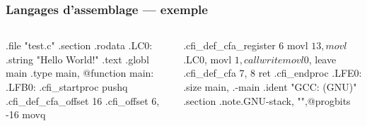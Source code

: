 \documentclass[utf8,10pt]{beamer}
\begin{document}
\begin{frame}[fragile]
    \frametitle{Langages d'assemblage --- exemple}

\begin{columns}[t]
    \begin{column}{0.49\textwidth}
            \begin{block}{}
\begin{pyglist}[language=shell] 
    .file   "test.c"
    .section        .rodata
.LC0:
    .string "Hello World!\n"
    .text
.globl main
    .type   main, @function
main:
.LFB0:
    .cfi_startproc
    pushq   %
    .cfi_def_cfa_offset 16
    .cfi_offset 6, -16
    movq    %
\end{pyglist}       
        \end{block}
    \end{column}
    
    \hfill
    
    \begin{column}{0.49\textwidth}
        \begin{block}{} 
\begin{pyglist}[language=shell] 
    .cfi_def_cfa_register 6
    movl    $13, %
    movl    $.LC0, %
    movl    $1, %
    call    write
    movl    $0, %
    leave
    .cfi_def_cfa 7, 8
    ret
    .cfi_endproc
.LFE0:
    .size    main, .-main
    .ident   "GCC: (GNU)"
    .section  .note.GNU-stack,
                  "",@progbits
\end{pyglist}
        \end{block}
    \end{column}
\end{columns}

\end{frame}
\end{document}
